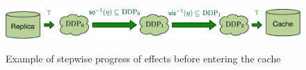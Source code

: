 \begin{figure}[t]
	\centering
	\setlength{\fboxsep}{6pt}%
	\includegraphics[scale =
	0.4]{Figures/Availability_deg.pdf}
	\\ 
	\hrulefill
\caption{Example of stepwise progress of effects before entering the
cache}
\label{fig:avail_deg}
\end{figure}
